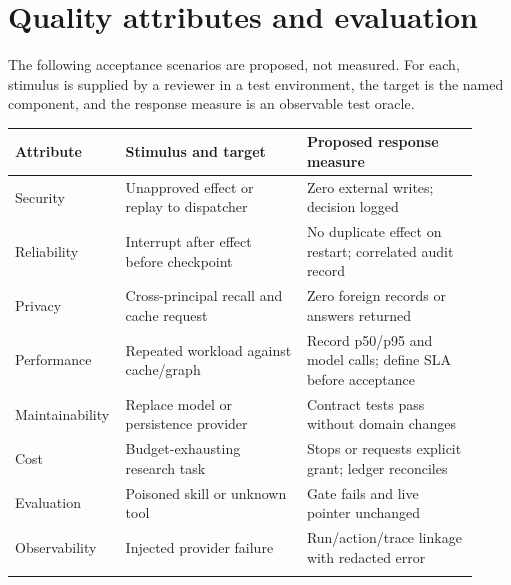 \documentclass[10pt,letterpaper]{article}
\begin{document}
\section{Quality attributes and evaluation}
The following acceptance scenarios are proposed, not measured. For each, stimulus is supplied by a reviewer in a test environment, the target is the named component, and the response measure is an observable test oracle.
\begin{longtable}{@{}>{\raggedright\arraybackslash}p{0.18\linewidth}>{\raggedright\arraybackslash}p{0.38\linewidth}>{\raggedright\arraybackslash}p{0.36\linewidth}@{}}
\toprule
Attribute & Stimulus and target & Proposed response measure\\\midrule\endhead
Security & Unapproved effect or replay to dispatcher & Zero external writes; decision logged\\\addlinespace
Reliability & Interrupt after effect before checkpoint & No duplicate effect on restart; correlated audit record\\\addlinespace
Privacy & Cross-principal recall and cache request & Zero foreign records or answers returned\\\addlinespace
Performance & Repeated workload against cache/graph & Record p50/p95 and model calls; define SLA before acceptance\\\addlinespace
Maintainability & Replace model or persistence provider & Contract tests pass without domain changes\\\addlinespace
Cost & Budget-exhausting research task & Stops or requests explicit grant; ledger reconciles\\\addlinespace
Evaluation & Poisoned skill or unknown tool & Gate fails and live pointer unchanged\\\addlinespace
Observability & Injected provider failure & Run/action/trace linkage with redacted error\\\addlinespace
\bottomrule\end{longtable}
\end{document}
